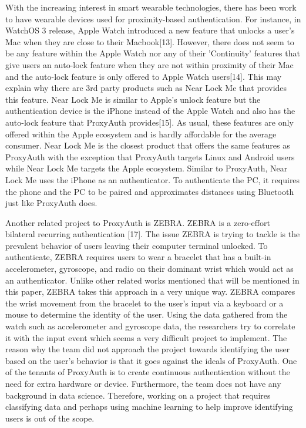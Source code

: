 \documentclass[letterpaper,twocolumn,10pt]{article}
\begin{document}
With the increasing interest in smart wearable technologies, there has been work to have wearable devices used for proximity-based authentication. For instance, in WatchOS 3 release, Apple Watch introduced a new feature that unlocks a user's Mac when they are close to their Macbook[13]. However, there does not seem to be any feature within the Apple Watch nor any of their 'Continuity' features that give users an auto-lock feature when they are not within proximity of their Mac and the auto-lock feature is only offered to Apple Watch users[14]. This may explain why there are 3rd party products such as Near Lock Me that provides this feature. Near Lock Me is similar to Apple's unlock feature but the authentication device is the iPhone instead of the Apple Watch and also has the auto-lock feature that ProxyAuth provides[15]. As usual, these features are only offered within the Apple ecosystem and is hardly affordable for the average consumer. Near Lock Me is the closest product that offers the same features as ProxyAuth with the exception that ProxyAuth targets Linux and Android users while Near Lock Me targets the Apple ecosystem. Similar to ProxyAuth, Near Lock Me uses the iPhone as an authenticator. To authenticate the PC, it requires the phone and the PC to be paired and approximates distances using Bluetooth just like ProxyAuth does.

Another related project to ProxyAuth is ZEBRA. ZEBRA is a zero-effort bilateral recurring authentication [17]. The issue ZEBRA is trying to tackle is the prevalent behavior of users leaving their computer terminal unlocked. To authenticate, ZEBRA requires users to wear a bracelet that has a built-in accelerometer, gyroscope, and radio on their dominant wrist which would act as an authenticator. Unlike other related works mentioned that will be mentioned in this paper, ZEBRA takes this approach in a very unique way. ZEBRA compares the wrist movement from the bracelet to the user's input via a keyboard or a mouse to determine the identity of the user. Using the data gathered from the watch such as accelerometer and gyroscope data, the researchers try to correlate it with the input event which seems a very difficult project to implement. The reason why the team did not approach the project towards identifying the user based on the user's behavior is that it goes against the ideals of ProxyAuth. One of the tenants of ProxyAuth is to create continuous authentication without the need for extra hardware or device. Furthermore, the team does not have any background in data science. Therefore, working on a project that requires classifying data and perhaps using machine learning to help improve identifying users is out of the scope.
\end{document}
